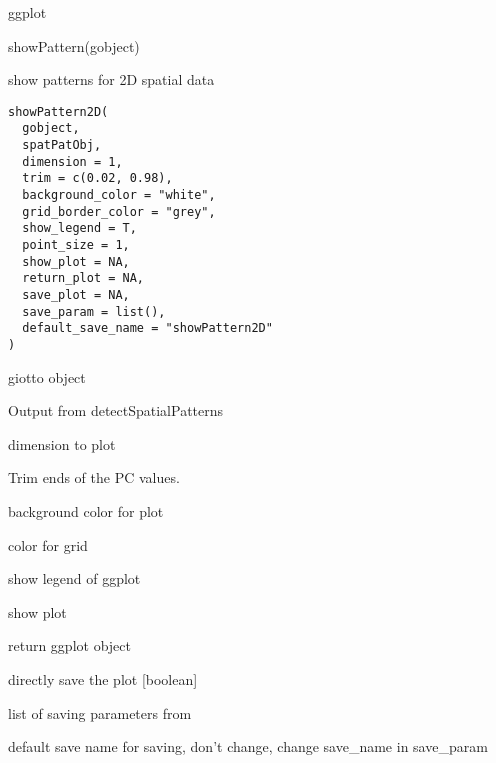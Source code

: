 \documentclass[a4paper]{book}
\begin{document}
%
\begin{Value}
ggplot
\end{Value}
%
\begin{SeeAlso}\relax
{}
\end{SeeAlso}
%
\begin{Examples}
\begin{ExampleCode}
    showPattern(gobject)
\end{ExampleCode}
\end{Examples}
%
\begin{Description}\relax
show patterns for 2D spatial data
\end{Description}
%
\begin{Usage}
\begin{verbatim}
showPattern2D(
  gobject,
  spatPatObj,
  dimension = 1,
  trim = c(0.02, 0.98),
  background_color = "white",
  grid_border_color = "grey",
  show_legend = T,
  point_size = 1,
  show_plot = NA,
  return_plot = NA,
  save_plot = NA,
  save_param = list(),
  default_save_name = "showPattern2D"
)
\end{verbatim}
\end{Usage}
%
\begin{Arguments}
\begin{ldescription}
\item[\code{gobject}] giotto object

\item[\code{spatPatObj}] Output from detectSpatialPatterns

\item[\code{dimension}] dimension to plot

\item[\code{trim}] Trim ends of the PC values.

\item[\code{background\_color}] background color for plot

\item[\code{grid\_border\_color}] color for grid

\item[\code{show\_legend}] show legend of ggplot

\item[\code{show\_plot}] show plot

\item[\code{return\_plot}] return ggplot object

\item[\code{save\_plot}] directly save the plot [boolean]

\item[\code{save\_param}] list of saving parameters from 

\item[\code{default\_save\_name}] default save name for saving, don't change, change save\_name in save\_param
\end{ldescription}
\end{Arguments}
\end{document}
